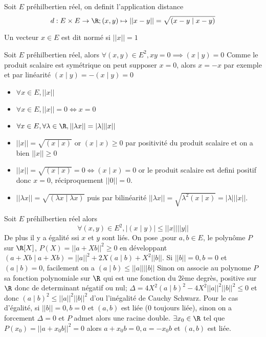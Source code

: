 \begin{defini}
    Soit $E$ préhilbertien réel, on definit l'application distance $$d: E \times E \to \R; (x,y)\mapsto ||x-y||=\sqrt{(x-y\mid x-y)}$$
\end{defini}
\begin{defini}
    Un vecteur $x\in E$ est dit normé si $||x||=1$
\end{defini}
\begin{prop}
    Soit $E$ préhilbertien réel, alors $\forall(x,y)\in E^2, xy=0\implies (x\mid y)=0$
    \tcblower
    Comme le produit scalaire est symétrique on peut supposer $x=0$, alors $x=-x$ par exemple et par linéarité $(x\mid y)=-(x\mid y)=0$
\end{prop}
\begin{prop}
    \begin{itemize}
        \item $\forall x\in E, ||x||$
        \item $\forall x\in E, ||x||=0 \iff x=0$
        \item $ \forall x\in E, \forall \lambda \in \R, ||\lambda x||=|\lambda| ||x||$
    \end{itemize}
    \tcblower
    \begin{itemize}
        \item $||x||=\sqrt{(x\mid x)}$ or $(x\mid x)\geq 0$ par positivité du produit scalaire et on a bien $||x||\geq 0$
        \item $||x||=\sqrt{(x\mid x)}=0\iff (x\mid x)=0$ or le produit scalaire est defini positif donc $x=0$, réciproquement $||0||=0$.
        \item $||\lambda x||=\sqrt{(\lambda x\mid \lambda x)}$ puis par bilinéarité $||\lambda x||=\sqrt{\lambda^2( x\mid x)}=|\lambda| ||x||$.
    \end{itemize}
\end{prop}
\begin{prop}
    Soit $E$ préhilbertien réel alors $$\forall (x,y)\in E^2, |(x\mid y)|\leq ||x|| ||y||$$
    De plus il y a égalité ssi $x$ et $y$ sont liés.
    \tcblower
    On pose ,pour $a,b\in E$, le polynôme $P$ sur $\R [X]$, $P(X)=||a+Xb||^2\geq 0$ en développant $(a+Xb\mid a+Xb)=||a||^2+2X(a\mid b)+X^2||b||$.
    Si $||b||=0,b=0$ et $(a\mid b)=0$, facilement on a $(a\mid b)\leq ||a|| ||b||$
    Sinon on associe au polynome $P$ sa fonction polynomiale sur $\R$ qui est une fonction du 2ème degrès, positive sur $\R$ donc de determinant négatif ou nul; $\Delta = 4X^2(a\mid b)^2-4X^2||a||^2||b||^2\leq 0$ et donc $(a\mid b)^2\leq ||a||^2||b||^2$ d'ou l'inégalité de Cauchy Schwarz.
    Pour le cas d'égalité, si $||b||=0,b=0$ et $(a,b)$ est liée (0 toujours liée), sinon on a forcement $\Delta=0$ et $P$ admet alors une racine double. $\exists x_0\in \R$ tel que $P(x_0)=||a+x_0b||^2=0$ alors $a+x_0b=0,a=-x_0b$ et $(a,b)$ est liée.
\end{prop}
\begin{prop}
     
\end{prop}